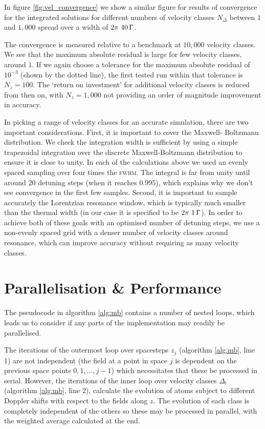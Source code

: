     In figure \ref{fig:vel_convergence} we show a similar figure for results of
    convergence for the integrated solutions for different numbers of velocity
    classes $N_\Delta$ between $1$ and $1,000$ spread over a width of
    $\unit[2\pi~40]{\Gamma}$.

    The convergence is measured relative to a benchmark at $10,000$ velocity
    classes.  We see that the maximum absolute residual is large for few
    velocity classes, around $1$. If we again choose a tolerance for the maximum
    absolute residual of $10^{-3}$ (shown by the dotted line), the first tested
    run within that tolerance is $N_z = 100$. The `return on investment' for
    additional velocity classes is reduced from then on, with $N_z = 1,000$ not
    providing an order of magnitude improvement in accuracy.

    In picking a range of velocity classes for an accurate simulation, there are
    two important considerations. First, it is important to cover the Maxwell-
    Boltzmann distribution. We check the integration width is sufficient by
    using a simple trapezoidal integration over the discrete Maxwell-Boltzmann
    distribution to ensure it is close to unity. In each of the calculations
    above we used an evenly spaced sampling over four times the \textsc{fwhm}.
    The integral is far from unity until around $20$ detuning steps (when it
    reaches $0.995$), which explains why we don't see convergence in the first
    few samples.  Second, it is important to sample accurately the Lorentzian
    resonance window, which is typically much smaller than the thermal width (in
    our case it is specified to be $\unit[2\pi~1]{\Gamma}$). In order to achieve
    both of these goals with an optimised number of detuning steps, we use a
    non-evenly spaced grid with a denser number of velocity classes around
    resonance, which can improve accuracy without requiring as many velocity
    classes.

  \section{Parallelisation \&  Performance}

    The pseudocode in algorithm \ref{alg:mb} contains a number of nested loops,
    which leads us to consider if any parts of the implementation may readily be
    parallelised. 

    The iterations of the outermost loop over spacesteps $z_j$ (algorithm
    \ref{alg:mb}, line 1) are not independent (\ie the field at a point in space
    $j$ is dependent on the previous space points $0, 1, \dots, j-1$) which
    necessitates that these be processed in serial. However, the iterations of
    the inner loop over velocity classes $\Delta_l$ (algorithm \ref{alg:mb},
    line 2), calculate the evolution of atoms subject to different Doppler
    shifts with respect to the fields along $z$. The evolution of each class is
    completely independent of the others so these may be processed in parallel,
    with the weighted average calculated at the end.

